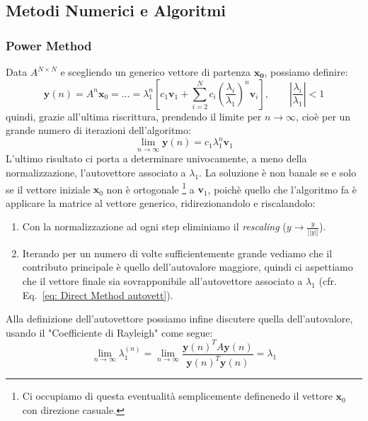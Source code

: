 \subsection{Metodi Numerici e Algoritmi}
\subsubsection{Power Method}
Data $A^{N\times N}$ e scegliendo un generico vettore di partenza $\boldsymbol{x_0}$, possiamo definire:
\[
\boldsymbol{y}(n) = A^n \boldsymbol x_0 = \dots = \lambda_1^n \left[ c_1 \boldsymbol{v}_1 + \sum_{i=2}^{N} c_i \left( \frac{\lambda_i}{\lambda_1} \right)^n \boldsymbol{v}_i \right], \quad \quad \left| \frac{\lambda_i}{\lambda_1} \right| < 1
\]
quindi, grazie all'ultima riscrittura, prendendo il limite per $n \xrightarrow{} \infty$, cioè per un grande numero di iterazioni dell'algoritmo:
\begin{equation} \label{eq: Direct Method autovett}
\lim_{n \xrightarrow{}\infty} \boldsymbol{y}(n) = c_1 \lambda_1^n \boldsymbol{v}_1
\end{equation}
L'ultimo risultato ci porta a determinare univocamente, a meno della normalizzazione, l'autovettore associato a $\lambda_1$. La soluzione è non banale se e solo se il vettore iniziale $\boldsymbol x_0$ non è ortogonale
\footnote{
Ci occupiamo di questa eventualità semplicemente definenedo il vettore $\boldsymbol x_0$ con direzione casuale.
}
a $\boldsymbol{v}_1$, poichè quello che l'algoritmo fa è applicare la matrice al vettore generico, ridirezionandolo e riscalandolo:
\begin{enumerate}
    \item Con la normalizzazione ad ogni step eliminiamo il \textit{rescaling} ($y \longrightarrow \frac{y}{||y||}$).
    \item Iterando per un numero di volte sufficientemente grande vediamo che il contributo principale è quello dell'autovalore maggiore, quindi ci aspettiamo che il vettore finale sia sovrapponibile all'autovettore associato a $\lambda_1$ (cfr. Eq.~\eqref{eq: Direct Method autovett}).
\end{enumerate}
Alla definizione dell'autovettore possiamo infine discutere quella dell'autovalore, usando il "Coefficiente di Rayleigh" come segue:
\begin{equation} \label{eq: Rayleigh Coeff}
\lim_{n\to\infty} \lambda_1^{(n)} = \lim_{n\to\infty} \frac{\boldsymbol{y}(n)^T A \boldsymbol{y}(n)}{\boldsymbol{y}(n)^T \boldsymbol{y}(n)} = \lambda_1
\end{equation}

